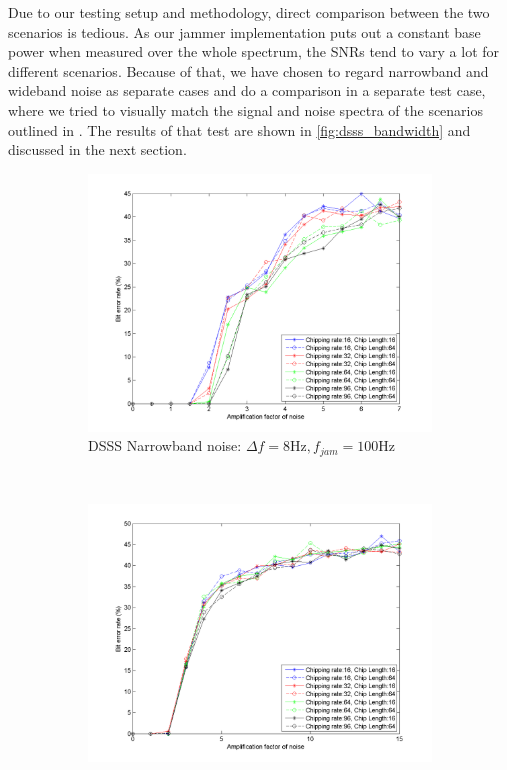 			Due to our testing setup and methodology, direct comparison between the two scenarios is tedious. As our jammer implementation puts out a constant base power when measured over the whole spectrum, the SNRs tend to vary a lot for different scenarios. Because of that, we have chosen to regard narrowband and wideband noise as separate cases and do a comparison in a separate test case, where we tried to visually match the signal and noise spectra of the scenarios outlined in \cite{ISS}. The results of that test are shown in \ref{fig:dsss_bandwidth} and discussed in the next section.
				\begin{figure}[H]
					\centering
					\caption{}
				    \begin{subfigure}[b]{0.5\textwidth}
						\includegraphics[width=\textwidth]{imgs/results/plot_mode_dsss-test_narrowband-rep_20-dataRate_8-dataLength_128.png}
						\caption{DSSS Narrowband noise: $\Delta f= 8 \text{Hz}, f_{jam} = 100\text{Hz}$}
						\label{fig:dsss_narrowband}
					\end{subfigure}%
					~
					\begin{subfigure}[b]{0.5\textwidth}
						\includegraphics[width=\textwidth]{imgs/results/plot_mode_dsss-test_wideband-rep_20-dataRate_8-dataLength_128.png}

\end{subfigure}
\end{figure}
